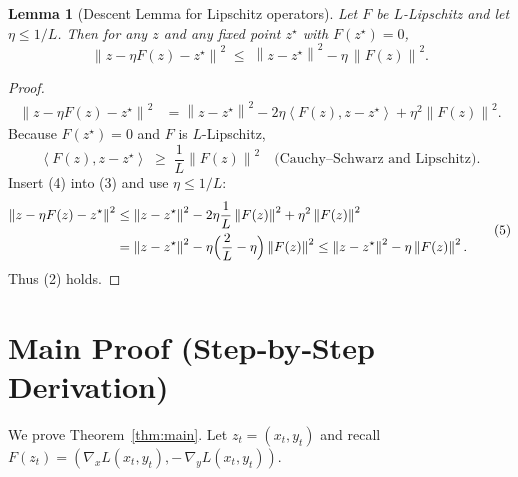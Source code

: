 \documentclass{article}
\newtheorem{lemma}{Lemma}
\newcommand{\norm}[1]{\left\lVert#1\right\rVert}
\newcommand{\inner}[2]{\left\langle #1,#2\right\rangle}
\begin{document}
\begin{lemma}[Descent Lemma for Lipschitz operators]\label{lem:descent}
Let \(F\) be \(L\)-Lipschitz and let \(\eta\le 1/L\). Then for any \(z\) and any fixed point \(z^\star\) with \(F(z^\star)=0\),
\[
\norm{z-\eta F(z)-z^\star}^{2}
\;\le\;
\norm{z-z^\star}^{2}
- \eta\,\norm{F(z)}^{2}.
\tag{2}
\]
\end{lemma}
\begin{proof}
\[
\begin{aligned}
\norm{z-\eta F(z)-z^\star}^{2}
&= \norm{z-z^\star}^{2}
-2\eta\inner{F(z)}{z-z^\star}
+\eta^{2}\norm{F(z)}^{2}. \tag{3}
\end{aligned}
\]
Because \(F(z^\star)=0\) and \(F\) is \(L\)-Lipschitz,
\[
\inner{F(z)}{z-z^\star}
\;\ge\;
\frac{1}{L}\norm{F(z)}^{2} \quad\text{(Cauchy–Schwarz and Lipschitz)} .
\tag{4}
\]
Insert (4) into (3) and use \(\eta\le 1/L\):
\[
\begin{aligned}
\norm{z-\eta F(z)-z^\star}^{2}
&\le \norm{z-z^\star}^{2}
-2\eta\frac{1}{L}\norm{F(z)}^{2}
+\eta^{2}\norm{F(z)}^{2}\\
&= \norm{z-z^\star}^{2}
-\eta\Bigl(\frac{2}{L}-\eta\Bigr)\norm{F(z)}^{2}
\le \norm{z-z^\star}^{2}
-\eta\norm{F(z)}^{2}.
\end{aligned}
\tag{5}
\]
Thus (2) holds. \qedhere
\end{proof}

\section*{Main Proof (Step‑by‑Step Derivation)}
We prove Theorem~\ref{thm:main}. Let \(z_t=(x_t,y_t)\) and recall \(F(z_t)=(\nabla_x L(x_t,y_t),-\,\nabla_y L(x_t,y_t))\).
\end{document}
